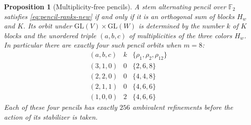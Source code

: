 \documentclass[11pt,a4paper]{amsart}
\newtheorem{prop}[thm]{Proposition}
\theoremstyle{definition}
\theoremstyle{remark}
\numberwithin{equation}{section}
\begin{document}
\begin{prop}[Multiplicity-free pencils]
\label{prop:MF-pencil-blocks-new}
A stem alternating pencil over $\mathbb F_2$ satisfies
\eqref{eq:pencil-ranks-new} if and only if it is an orthogonal sum
of blocks $H_w$ and $K$. Its orbit under
$\mathrm{GL}(V)\times\mathrm{GL}(W)$ is determined by the number
$k$ of $K$ blocks and the unordered triple $(a,b,c)$ of multiplicities
of the three colors $H_w$. In particular there are exactly four
such pencil orbits when $m=8$:
\[
\begin{array}{c|c|c}
 (a,b,c)&k&\{\rho_1,\rho_2,\rho_{12}\}\\\hline
 (3,1,0)&0&\{2,6,8\}\\
 (2,2,0)&0&\{4,4,8\}\\
 (2,1,1)&0&\{4,6,6\}\\
 (1,0,0)&2&\{4,6,6\}
\end{array}
\]
Each of these four pencils has exactly $256$ ambivalent refinements
before the action of its stabilizer is taken.
\end{prop}
\end{document}
